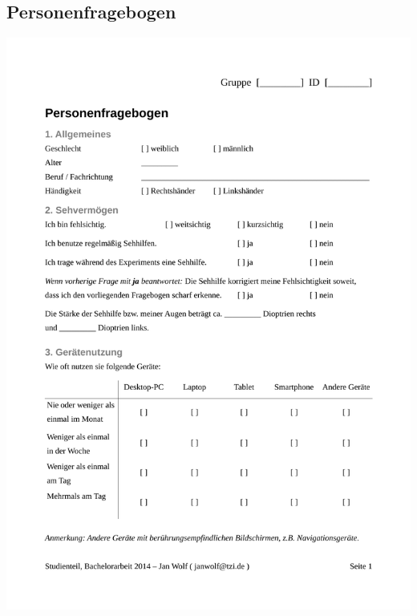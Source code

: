 \documentclass[a4paper,12pt,bibliography=totoc]{scrreprt}%
\begin{document}
\begin{appendix}
\section{Personenfragebogen}
\includegraphics[width=\textwidth, page=1]{apx/Personenfragebogen} 
\label{lab:Personenfragebogen}


\end{appendix}
\end{document}
